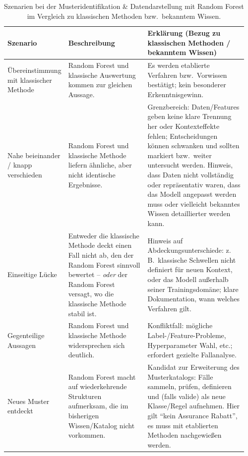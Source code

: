 \begin{table}[h!]
\centering
\small
\begin{tabular}{p{0.18\linewidth}p{0.35\linewidth}p{0.43\linewidth}}
\toprule
\textbf{Szenario} & \textbf{Beschreibung} & \textbf{Erklärung (Bezug zu klassischen Methoden / bekanntem Wissen)} \\
\midrule
Übereinstimmung mit klassischer Methode & Random Forest und klassische Auswertung kommen zur gleichen Aussage. & Es werden etablierte Verfahren bzw.\ Vorwissen bestätigt; kein besonderer Erkenntnisgewinn. \\
\addlinespace
Nahe beieinander / knapp verschieden & Random Forest und klassische Methode liefern ähnliche, aber nicht identische Ergebnisse. & Grenzbereich: Daten/Features geben keine klare Trennung her oder Kontexteffekte fehlen; Entscheidungen können schwanken und sollten markiert bzw.\ weiter untersucht werden. Hinweis, dass Daten nicht vollständig oder repräsentativ waren, dass das Modell angepasst werden muss oder vielleicht bekanntes Wissen detaillierter werden kann.\\
\addlinespace
Einseitige Lücke & Entweder die klassische Methode deckt einen Fall nicht ab, den der Random Forest sinnvoll bewertet – \emph{oder} der Random Forest versagt, wo die klassische Methode stabil ist. & Hinweis auf Abdeckungsunterschiede: z.\,B.\ klassische Schwellen nicht definiert für neuen Kontext, oder das Modell außerhalb seiner Trainingsdomäne; klare Dokumentation, wann welches Verfahren gilt. \\
\addlinespace
Gegenteilige Aussagen & Random Forest und klassische Methode widersprechen sich deutlich. & Konfliktfall: mögliche Label-/Feature-Probleme, Hyperparameter Wahl, etc.; erfordert gezielte Fallanalyse. \\
\addlinespace
Neues Muster entdeckt & Random Forest macht auf wiederkehrende Strukturen aufmerksam, die im bisherigen Wissen/Katalog nicht vorkommen. & Kandidat zur Erweiterung des Musterkatalogs: Fälle sammeln, prüfen, definieren und (falls valide) als neue Klasse/Regel aufnehmen. Hier gilt ``kein Assurance Rabatt'', es muss mit etablierten Methoden nachgewießen werden. \\
\bottomrule
\end{tabular}
\caption{Szenarien bei der Musteridentifikation \& Datendarstellung mit Random Forest im Vergleich zu klassischen Methoden bzw.\ bekanntem Wissen.}
\end{table}


